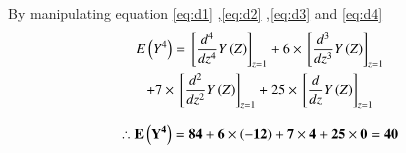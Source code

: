\documentclass[journal,12pt,twocolumn]{IEEEtran}
\begin{document}
By manipulating equation \eqref{eq:d1} ,\eqref{eq:d2} ,\eqref{eq:d3} and \eqref{eq:d4}
\begin{multline}
    E\left(Y^4\right)={}\left[\frac{d^4}{dz^4}Y\left(Z\right)\right]_{z=1} + 6 \times {}\left[\frac{d^3}{dz^3}Y\left(Z\right)\right]_{z=1} \\+ 7 \times {}\left[\frac{d^2}{dz^2}Y\left(Z\right)\right]_{z=1} +25 \times {}\left[\frac{d}{dz}Y\left(Z\right)\right]_{z=1}
\end{multline}

\begin{align*}
    \mathbf{\therefore E\left(Y^4\right)=84+6\times\left(-12\right)+7\times4+25\times0=40}
\end{align*}
\end{document}
